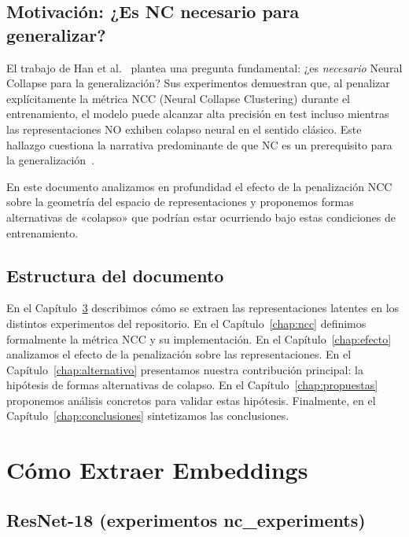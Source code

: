 \documentclass[12pt,a4paper]{report}
\begin{document}
\section{Motivación: ¿Es NC necesario para generalizar?}

El trabajo de Han et al.~\cite{han2025flatness} plantea una pregunta fundamental: ¿es \emph{necesario} Neural Collapse para la generalización? Sus experimentos demuestran que, al penalizar explícitamente la métrica NCC (Neural Collapse Clustering) durante el entrenamiento, el modelo puede alcanzar alta precisión en test incluso mientras las representaciones NO exhiben colapso neural en el sentido clásico. Este hallazgo cuestiona la narrativa predominante de que NC es un prerequisito para la generalización~\cite{papyan2020prevalence, zhu2021geometric}.

En este documento analizamos en profundidad el efecto de la penalización NCC sobre la geometría del espacio de representaciones y proponemos formas alternativas de «colapso» que podrían estar ocurriendo bajo estas condiciones de entrenamiento.

\section{Estructura del documento}

En el Capítulo~\ref{chap:embeddings} describimos cómo se extraen las representaciones latentes en los distintos experimentos del repositorio. En el Capítulo~\ref{chap:ncc} definimos formalmente la métrica NCC y su implementación. En el Capítulo~\ref{chap:efecto} analizamos el efecto de la penalización sobre las representaciones. En el Capítulo~\ref{chap:alternativo} presentamos nuestra contribución principal: la hipótesis de formas alternativas de colapso. En el Capítulo~\ref{chap:propuestas} proponemos análisis concretos para validar estas hipótesis. Finalmente, en el Capítulo~\ref{chap:conclusiones} sintetizamos las conclusiones.

\chapter{Cómo Extraer Embeddings}
\label{chap:embeddings}

\section{ResNet-18 (experimentos nc\_experiments)}
\end{document}
